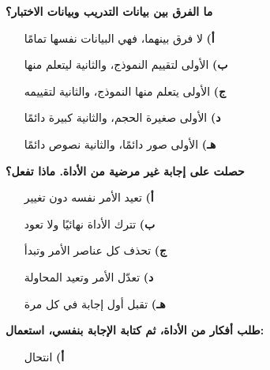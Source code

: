 \documentclass[11pt,a4paper]{article}
\begin{document}
\begin{multicols}{2}
\begin{minipage}{\linewidth}
\begin{itemize}[leftmargin=0.95cm, labelsep=4pt, itemsep=0pt, topsep=2pt, parsep=0pt]
\end{itemize}
\end{minipage}\par\vspace{7pt plus 4pt}
\noindent\begin{minipage}{\linewidth}
\hangindent=0.7cm\textbf{ما الفرق بين بيانات التدريب وبيانات الاختبار؟}
\begin{itemize}[leftmargin=0.95cm, labelsep=4pt, itemsep=0pt, topsep=2pt, parsep=0pt]
  \item[\textbf{أ)}] لا فرق بينهما، فهي البيانات نفسها تمامًا
  \item[\textbf{ب)}] الأولى لتقييم النموذج، والثانية ليتعلم منها
  \item[\textbf{ج)}] الأولى يتعلم منها النموذج، والثانية لتقييمه
  \item[\textbf{د)}] الأولى صغيرة الحجم، والثانية كبيرة دائمًا
  \item[\textbf{هـ)}] الأولى صور دائمًا، والثانية نصوص دائمًا
\end{itemize}
\end{minipage}\par\vspace{7pt plus 4pt}
\noindent\begin{minipage}{\linewidth}
\hangindent=0.7cm\textbf{حصلت على إجابة غير مرضية من الأداة. ماذا تفعل؟}
\begin{itemize}[leftmargin=0.95cm, labelsep=4pt, itemsep=0pt, topsep=2pt, parsep=0pt]
  \item[\textbf{أ)}] تعيد الأمر نفسه دون تغيير
  \item[\textbf{ب)}] تترك الأداة نهائيًا ولا تعود
  \item[\textbf{ج)}] تحذف كل عناصر الأمر وتبدأ
  \item[\textbf{د)}] تعدّل الأمر وتعيد المحاولة
  \item[\textbf{هـ)}] تقبل أول إجابة في كل مرة
\end{itemize}
\end{minipage}\par\vspace{7pt plus 4pt}
\noindent\begin{minipage}{\linewidth}
\hangindent=0.7cm\textbf{طلب أفكار من الأداة، ثم كتابة الإجابة بنفسي، استعمال:}
\begin{itemize}[leftmargin=0.95cm, labelsep=4pt, itemsep=0pt, topsep=2pt, parsep=0pt]
  \item[\textbf{أ)}] انتحال

\end{itemize}
\end{minipage}
\end{multicols}
\end{document}

